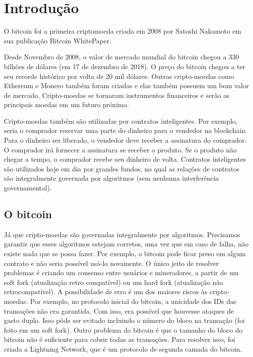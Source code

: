\documentclass[12pt]{article}
\begin{document}
\tableofcontents
\pagebreak

\renewcommand{\thesection}{\arabic{section}}
\section{Introdução}

O bitcoin \cite{nakamoto2008bitcoin}
foi a primeira criptomoeda criada em 2008 por Satoshi Nakamoto em sua publicação Bitcoin WhitePaper.

Desde Novembro de 2008, o valor de mercado mundial do bitcoin chegou a 330 bilhões de dólares (em 17 de dezembro de 2018). O preço do bitcoin chegou a ter seu recorde histórico por volta de 20 mil dólares. Outras cripto-moedas como Ethereum e Monero também foram criadas e elas também possuem um bom valor de mercado. Cripto-moedas se tornaram instrumentos financeiros e serão as principais moedas em um futuro próximo.

Cripto-moedas também são utilizadas por contratos inteligentes. Por exemplo, seria o comprador reservar uma parte do dinheiro para o vendedor na blockchain. Para o dinheiro ser liberado, o vendedor deve receber a assinatura do comprador. O comprador irá fornecer a assinatura se receber o produto. Se o produto não chegar a tempo, o comprador recebe seu dinheiro de volta. Contratos inteligentes são utilizados hoje em dia por grandes fundos, no qual as relações de contratos são integralmente governada por algoritmos (sem nenhuma interferência governamental).

\subsection{O bitcoin}

Já que cripto-moedas são governadas integralmente por algoritmos.
Precisamos garantir que esses algoritmos estejam corretos, uma vez que em caso de falha,
não existe nada que se possa fazer. Por exemplo, o bitcoin pode ficar preso em algum contrato e não seria possível usá-lo novamente.
O único jeito de resolver problemas é criando um consenso entre usuários e mineradores,
a partir de um soft fork (atualização retro compatível) ou um hard fork (atualização não retrocompatível).
A possibilidade de erro é um dos maiores riscos às cripto-moedas.
Por exemplo, no protocolo inicial do bitcoin, a unicidade dos IDs das transações não era garantida.
Com isso, era possível que houvesse ataques de gasto duplo.
Isso pôde ser evitado incluindo o número do bloco na transação (foi feito em um soft fork).
Outro problema do bitcoin é que o tamanho do bloco do bitcoin não é suficiente para cobrir todas as transações.
Para resolver isso, foi criada a Lightning Network, que é um protocolo de segunda camada do bitcoin.
\end{document}
